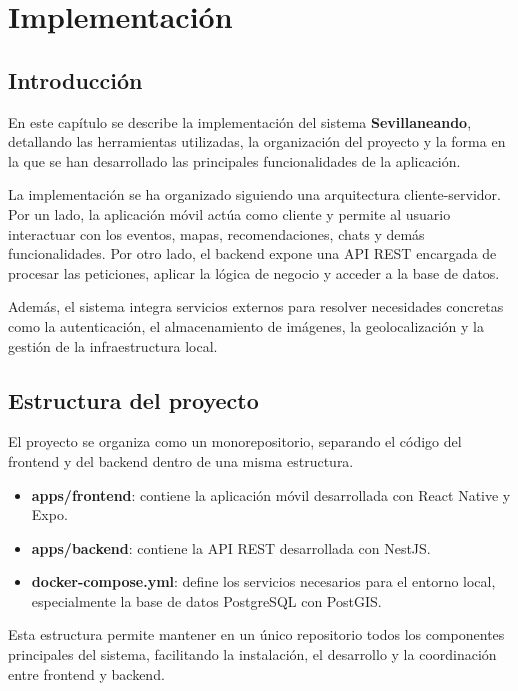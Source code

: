 \chapter{Implementación}\label{cap:implementacion}

\section{Introducción}

En este capítulo se describe la implementación del sistema \textbf{Sevillaneando}, detallando las herramientas utilizadas, la organización del proyecto y la forma en la que se han desarrollado las principales funcionalidades de la aplicación.

La implementación se ha organizado siguiendo una arquitectura cliente-servidor. Por un lado, la aplicación móvil actúa como cliente y permite al usuario interactuar con los eventos, mapas, recomendaciones, chats y demás funcionalidades. Por otro lado, el backend expone una API REST encargada de procesar las peticiones, aplicar la lógica de negocio y acceder a la base de datos.

Además, el sistema integra servicios externos para resolver necesidades concretas como la autenticación, el almacenamiento de imágenes, la geolocalización y la gestión de la infraestructura local.

\section{Estructura del proyecto}

El proyecto se organiza como un monorepositorio, separando el código del frontend y del backend dentro de una misma estructura.

\begin{itemize}
    \item \textbf{apps/frontend}: contiene la aplicación móvil desarrollada con React Native y Expo.
    \item \textbf{apps/backend}: contiene la API REST desarrollada con NestJS.
    \item \textbf{docker-compose.yml}: define los servicios necesarios para el entorno local, especialmente la base de datos PostgreSQL con PostGIS.
\end{itemize}

Esta estructura permite mantener en un único repositorio todos los componentes principales del sistema, facilitando la instalación, el desarrollo y la coordinación entre frontend y backend.

